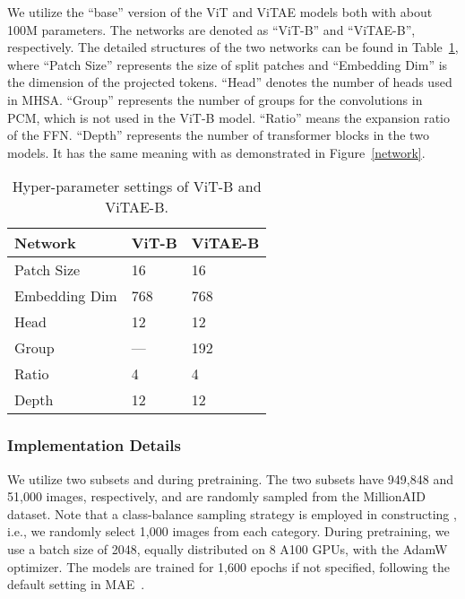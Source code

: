 \documentclass[10pt, journal,twoside]{IEEEtran}
\begin{document}
We utilize the ``base'' version of the ViT and ViTAE models both with about 100M parameters. The networks are denoted as ``ViT-B'' and ``ViTAE-B'', respectively. The detailed structures of the two networks can be found in Table~\ref{two_networks}, where ``Patch Size'' represents the size of split patches and ``Embedding Dim'' is the dimension of the projected tokens.  ``Head'' denotes the number of heads used in MHSA. ``Group'' represents the number of groups for the convolutions in PCM, which is not used in the ViT-B model. ``Ratio'' means the expansion ratio of the FFN. ``Depth'' represents the number of transformer blocks in the two models. It has the same meaning with  as demonstrated in Figure~\ref{network}.

\begin{table}[t]
  \scriptsize
  \caption{Hyper-parameter settings of ViT-B and ViTAE-B.}
  \newcommand{\tabincell}[2]{\begin{tabular}{@{}#1@{}}#2\end{tabular}}
  \centering
  \begin{tabular}{l|l|l}
  \hline
  Network& ViT-B \cite{xu2021vitae} & ViTAE-B \cite{vitae_v2} \\
  \hline
  Patch Size & 16 & 16 \\
  Embedding Dim & 768 & 768 \\
  Head & 12 & 12 \\
  Group & --- & 192 \\
  Ratio & 4 & 4 \\
  Depth & 12 & 12  \\
  \hline
\end{tabular}
  \label{two_networks}
\end{table}

\subsubsection{Implementation Details}
\label{subsubsec:implementationdetails}
We utilize two subsets  and  during pretraining. The two subsets have 949,848 and 51,000 images, respectively, and are randomly sampled from the MillionAID dataset. Note that a class-balance sampling strategy is employed in constructing , i.e., we randomly select 1,000 images from each category. During pretraining, we use a batch size of 2048, equally distributed on 8 A100 GPUs, with the AdamW~\cite{adamw} optimizer. The models are trained for 1,600 epochs if not specified, following the default setting in MAE~\cite{mae}. 
\end{document}
